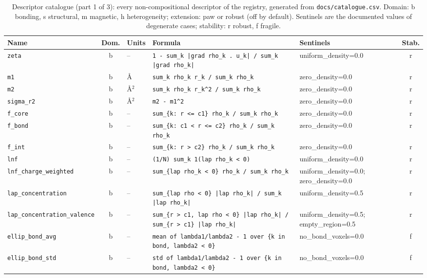 \begin{table}[p]
\centering
\caption{Descriptor catalogue (part 1 of 3): every non-compositional descriptor of the registry, generated from \texttt{docs/catalogue.csv}. Domain: b bonding, s structural, m magnetic, h heterogeneity; extension: paw or robust (off by default). Sentinels are the documented values of degenerate cases; stability: r robust, f fragile.}
\label{tab:si-catalogue}
\scriptsize
\begin{tabular}{p{3.3cm}cp{1.4cm}p{6.6cm}p{2.3cm}c}
\toprule
Name & Dom. & Units & Formula & Sentinels & Stab. \\
\midrule
\texttt{zeta} & b & -- & \texttt{1 - sum\_k |grad rho\_k . u\_k| / sum\_k |grad rho\_k|} & uniform\_density=0.0 & r \\
\texttt{m1} & b & \AA & \texttt{sum\_k rho\_k r\_k / sum\_k rho\_k} & zero\_density=0.0 & r \\
\texttt{m2} & b & \AA$^2$ & \texttt{sum\_k rho\_k r\_k\^{}2 / sum\_k rho\_k} & zero\_density=0.0 & r \\
\texttt{sigma\_r2} & b & \AA$^2$ & \texttt{m2 - m1\^{}2} & zero\_density=0.0 & r \\
\texttt{f\_core} & b & -- & \texttt{sum\_\{k: r <= c1\} rho\_k / sum\_k rho\_k} & zero\_density=0.0 & r \\
\texttt{f\_bond} & b & -- & \texttt{sum\_\{k: c1 < r <= c2\} rho\_k / sum\_k rho\_k} & zero\_density=0.0 & r \\
\texttt{f\_int} & b & -- & \texttt{sum\_\{k: r > c2\} rho\_k / sum\_k rho\_k} & zero\_density=0.0 & r \\
\texttt{lnf} & b & -- & \texttt{(1/N) sum\_k 1(lap rho\_k < 0)} & uniform\_density=0.0 & r \\
\texttt{lnf\_charge\_weighted} & b & -- & \texttt{sum\_\{lap rho\_k < 0\} rho\_k / sum\_k rho\_k} & uniform\_density=0.0; zero\_density=0.0 & r \\
\texttt{lap\_concentration} & b & -- & \texttt{sum\_\{lap rho < 0\} |lap rho\_k| / sum\_k |lap rho\_k|} & uniform\_density=0.5 & r \\
\texttt{lap\_concentration\_valence} & b & -- & \texttt{sum\_\{r > c1, lap rho < 0\} |lap rho\_k| / sum\_\{r > c1\} |lap rho\_k|} & uniform\_density=0.5; empty\_region=0.5 & r \\
\texttt{ellip\_bond\_avg} & b & -- & \texttt{mean of lambda1/lambda2 - 1 over \{k in bond, lambda2 < 0\}} & no\_bond\_voxels=0.0 & f \\
\texttt{ellip\_bond\_std} & b & -- & \texttt{std of lambda1/lambda2 - 1 over \{k in bond, lambda2 < 0\}} & no\_bond\_voxels=0.0 & f \\

\end{tabular}
\end{table}

